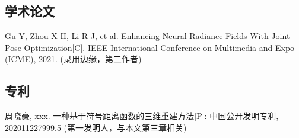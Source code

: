 
\begin{resume}

   \subsection*{学术论文}

   \begin{achievements}
   	\item Gu Y, Zhou X H, Li R J, et al. Enhancing Neural Radiance Fields With Joint Pose Optimization[C]. IEEE International Conference on Multimedia and Expo (ICME), 2021. (录用边缘，第二作者)
   	
   \end{achievements}


  \subsection*{专利}

  \begin{achievements}
    \item 周晓豪, xxx. 一种基于符号距离函数的三维重建方法[P]: 中国公开发明专利, 202011227999.5 (第一发明人，与本文第三章相关)
    
    
  \end{achievements}

\end{resume}
